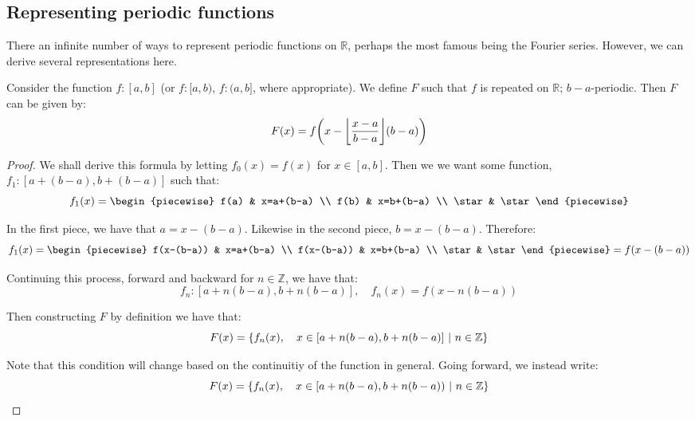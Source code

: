 \subsection{Representing periodic functions}
There an infinite number of ways to represent periodic functions on $\mathbb{R}$, perhaps the most famous being the Fourier series. However, we can derive several representations here.

\begin{theorem}
    Consider the function $f:[a,b]$ (or $f:[a,b)$, $f:(a,b]$, where appropriate). We define $F$ such that $f$ is repeated on $\mathbb{R}$; $b-a$-periodic. Then $F$ can be given by:
    $$
        F(x) = f\paren*{x-\floor*{\frac{x-a}{b-a}}(b-a)}
    $$

    \begin{proof}
        \label{proof:periodic_proof}
        We shall derive this formula by letting $f_0(x)=f(x)$ for $x\in [a,b]$. Then we we want some function, $f_1:[a+(b-a),b+(b-a)]$ such that:
        $$
            f_1(x) = \begin{piecewise}
                f(a) & x=a+(b-a) \\
                f(b) & x=b+(b-a) \\
                \star & \star
            \end{piecewise}
        $$

        In the first piece, we have that $a=x-(b-a)$. Likewise in the second piece, $b=x-(b-a)$. Therefore:
        $$
            f_1(x) = \begin{piecewise}
                f(x-(b-a)) & x=a+(b-a) \\
                f(x-(b-a)) & x=b+(b-a) \\
                \star & \star
            \end{piecewise} = f(x-(b-a))
        $$

        Continuing this process, forward and backward for $n\in\mathbb{Z}$, we have that:
        $$
            f_n:[a+n(b-a),b+n(b-a)],\quad f_n(x) = f(x-n(b-a))
        $$

        Then constructing $F$ by definition we have that:
        $$
            F(x) = \left\{f_n(x),\quad x\in[a+n(b-a),b+n(b-a)]\ \middle|\ n\in\mathbb{Z}\right\}
        $$

        Note that this condition will change based on the continuitiy of the function in general. Going forward, we instead write:
        $$
            F(x) = \left\{f_n(x),\quad x\in[a+n(b-a),b+n(b-a))\ \middle|\ n\in\mathbb{Z}\right\}
        $$


\end{proof}
\end{theorem}
